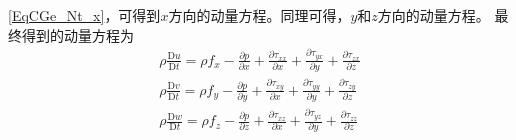 \eqref{EqCGe_Nt_x}，可得到$x$方向的动量方程。同理可得，$y$和$z$方向的动量方程。
最终得到的动量方程为
\begin{equation}
  \begin{aligned}
    \rho \frac{\mathrm{D}u}{\mathrm{D}t} =
    \rho f_{x}
    -\frac{\partial p}{\partial x}
    +\frac{\partial \tau_{xx}}{\partial x}
    +\frac{\partial \tau_{yx}}{\partial y}
    +\frac{\partial \tau_{zx}}{\partial z}
    \\
    \rho \frac{\mathrm{D}v}{\mathrm{D}t} =
    \rho f_{y}
    -\frac{\partial p}{\partial y}
    +\frac{\partial \tau_{xy}}{\partial x}
    +\frac{\partial \tau_{yy}}{\partial y}
    +\frac{\partial \tau_{zy}}{\partial z}
    \\
    \rho \frac{\mathrm{D}w}{\mathrm{D}t} =
    \rho f_{z}
    -\frac{\partial p}{\partial z}
    +\frac{\partial \tau_{xz}}{\partial x}
    +\frac{\partial \tau_{yz}}{\partial y}
    +\frac{\partial \tau_{zz}}{\partial z}
  \end{aligned}
  \label{EqCGe_NS_Me_ori}
\end{equation}

